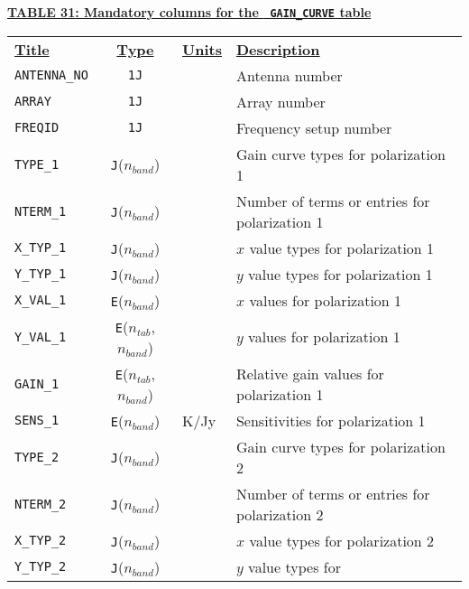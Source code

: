 \documentclass[twoside]{article}
\newcommand{\Hi}[1]{\textcolor{hicol}{#1}}
\newcommand{\nband}{$n_{band}$}
\newcommand{\ntab}{$n_{tab}$}
\begin{document}
\begin{center}
\underline{\bf{TABLE \Hi{31}: Mandatory columns for the {\tt
      GAIN\_CURVE} table}}\\
\begin{tabular}{lcll}
\noalign{\vspace{2pt}}
\underline{{\bf Title\vphantom{y}}} & \underline{\bf{Type}} &
   \underline{{\bf Units\vphantom{y}}} & \underline{\bf{Description}} \\
\noalign{\vspace{2pt}}
{\tt ANTENNA\_NO} & {\tt 1J} &       & Antenna number \\
{\tt ARRAY}       & {\tt 1J} &       & Array number \\
{\tt FREQID}      & {\tt 1J} &       & Frequency setup number \\
{\tt TYPE\_1}     & {\tt J}(\nband) &  & Gain curve types for
                                         polarization 1 \\
{\tt NTERM\_1}    & {\tt J}(\nband) &  & Number of terms or entries for
                                         polarization 1 \\
{\tt X\_TYP\_1}   & {\tt J}(\nband) &  & $x$ value types for
                                         polarization 1 \\
{\tt Y\_TYP\_1}   & {\tt J}(\nband) &  & $y$ value types for
                                         polarization 1 \\
{\tt X\_VAL\_1}   & {\tt E}(\nband) &  & $x$ values for polarization 1 \\
{\tt Y\_VAL\_1}   & {\tt E}(\ntab,\nband) &  & $y$ values for polarization 1 \\
{\tt GAIN\_1}     & {\tt E}(\ntab,\nband) &  & Relative gain values
                                         for polarization 1 \\
{\tt SENS\_1}     & {\tt E}(\nband) & K/Jy& Sensitivities for
                                         polarization 1 \\
\hline
{\tt TYPE\_2}     & {\tt J}(\nband) &  & Gain curve types for
                                         polarization 2 \\
{\tt NTERM\_2}    & {\tt J}(\nband) &  & Number of terms or entries for
                                         polarization 2 \\
{\tt X\_TYP\_2}   & {\tt J}(\nband) &  & $x$ value types for
                                         polarization 2 \\
{\tt Y\_TYP\_2}   & {\tt J}(\nband) &  & $y$ value types for

\end{tabular}
\end{center}
\end{document}
